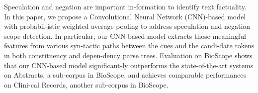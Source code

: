 Speculation and negation are important in-formation to identify text factuality. In this paper, we propose a Convolutional Neural Network (CNN)-based model with probabil-istic weighted average pooling to address speculation and negation scope detection. In particular, our CNN-based model extracts those meaningful features from various syn-tactic paths between the cues and the candi-date tokens in both constituency and depen-dency parse trees. Evaluation on BioScope shows that our CNN-based model significant-ly outperforms the state-of-the-art systems on Abstracts, a sub-corpus in BioScope, and achieves comparable performances on Clini-cal Records, another sub-corpus in BioScope.
